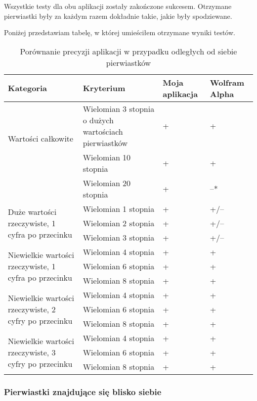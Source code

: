 \documentclass[oneside,a4paper]{book}
\begin{document}
	Wszystkie testy dla obu aplikacji zostały zakończone sukcesem. Otrzymane pierwiastki były za każdym razem dokładnie takie, jakie były spodziewane.
	
	Poniżej przedstawiam tabelę, w której umieściłem otrzymane wyniki testów.
	
	\begin{table}
		\caption{Porównanie precyzji aplikacji w przypadku odległych od siebie pierwiastków}
		\begin{tabular}{ |p{5cm}|p{5cm}|p{1.5cm}|p{1.5cm}| } 
			\hline
			Kategoria & Kryterium & Moja aplikacja & Wolfram Alpha \\
			\hline
			\multirow{2}{*}{Wartości całkowite}
			& Wielomian 3 stopnia o dużych wartościach pierwiastków & + & + \\
			& Wielomian 10 stopnia & + & + \\
			& Wielomian 20 stopnia & + & --* \\
			\hline
			\multirow{3}{12em}{Duże wartości rzeczywiste, 1 cyfra po przecinku}
			& Wielomian 1 stopnia & + & +/-- \\
			& Wielomian 2 stopnia & + & +/-- \\
			& Wielomian 3 stopnia & + & +/-- \\
			\hline
			\multirow{3}{14em}{Niewielkie wartości rzeczywiste, 1 cyfra po przecinku}
			& Wielomian 4 stopnia & + & + \\
			& Wielomian 6 stopnia & + & + \\
			& Wielomian 8 stopnia & + & + \\
			\hline
			\multirow{3}{14em}{Niewielkie wartości rzeczywiste, 2 cyfry po przecinku}
			& Wielomian 4 stopnia & + & + \\
			& Wielomian 6 stopnia & + & + \\
			& Wielomian 8 stopnia & + & + \\
			\hline
			\multirow{3}{14em}{Niewielkie wartości rzeczywiste, 3 cyfry po przecinku}
			& Wielomian 4 stopnia & + & + \\
			& Wielomian 6 stopnia & + & + \\
			& Wielomian 8 stopnia & + & + \\
			\hline
		\end{tabular}
	\end{table}
	
	\subsubsection {Pierwiastki znajdujące się blisko siebie}
	
\end{document}
